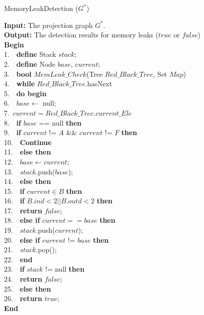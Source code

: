 \begin{algorithm}
\caption{MemoryLeakDetection ($G^*$)}\label{alg:mld}
\textbf{Input:} The projection graph $G^*$.\\
\textbf{Output:} The detection results for memory leaks ($\mathit{true}$ or $\mathit{false}$)\\
\textbf{Begin}\\
1.\ \	      \textbf{define} Stack $\mathit{stack}$;\\
2.\ \ 	\textbf{define} Node $\mathit{base}$, $\mathit{current}$;\\
3.\ \       \textbf{bool} $\mathit{MemLeak\_Check}$(Tree $\mathit{Red\_Black\_Tree}$, Set $\mathit{Map}$)\\
4.\ \ 	\textbf{while} $\mathit{Red\_Black\_Tree}$.hasNext\\
5.\ \ 	\textbf{do begin}\\
6.\ \ \quad	    $\mathit{base} \leftarrow$ null;\\
7.\ \quad	    $\mathit{current} = \mathit{Red\_Black\_Tree}$.$\mathit{current\_Ele}$\\
8.\ \ \quad	    \textbf{if} $\mathit{base}$ == null \textbf{then}\\
9.\ \ \quad\quad	        \textbf{if} $\mathit{current}$ != $A$ \&\& $\mathit{current}$ != $F$ \textbf{then}\\
10.\ \ \quad\quad\quad	            \textbf{Continue}\\
11.\ \ \quad\quad	        \textbf{else then}\\
12.\ \ \quad\quad\quad	            $\mathit{base} \leftarrow \mathit{current}$;\\
13.\ \ \quad\quad\quad	            $\mathit{stack}$.push($\mathit{base}$);\\
14.\ \ \quad	    \textbf{else then}\\
15.\ \ \quad\quad       \textbf{if} $\mathit{current}\in B$ \textbf{then}\\
16.\ \ \quad\quad\quad            \textbf{if} $B.ind<2 || B.outd<2$ \textbf{then}\\
17.\ \ \quad\quad\quad\quad	                \textbf{return} $\mathit{false}$;\\
18.\ \ \quad\quad\quad        \textbf{else if} $\mathit{current} == \mathit{base}$ \textbf{then}\\
19.\ \ \quad\quad\quad\quad	            $\mathit{stack}$.push($\mathit{current}$);\\
20.\ \ \quad\quad\quad	        \textbf{else if} $\mathit{current}$ != $\mathit{base}$ \textbf{then}\\
21.\ \ \quad\quad\quad\quad	            $\mathit{stack}$.pop();\\
22.\ \ 	\textbf{end}\\
23.\ \ 	\textbf{if} $\mathit{stack}$ != null \textbf{then}\\
24.\ \ \quad    \textbf{return} $\mathit{false}$;\\
25.\ \ 	\textbf{else then}\\
26.\ \ \quad	    \textbf{return} $\mathit{true}$;\\
\textbf{End}
\end{algorithm}

